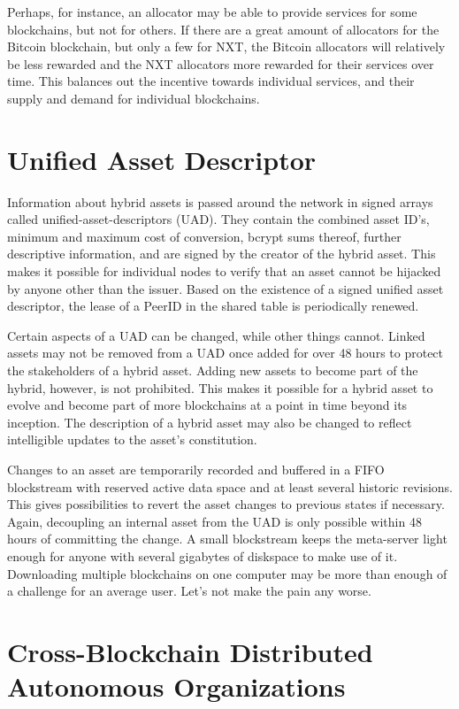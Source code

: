 \documentclass[11pt, a4paper]{article}
\begin{document}
Perhaps, for instance, an allocator may be able to provide services for some blockchains, but not for others. If there are a great amount of allocators for the Bitcoin blockchain, but only a few for NXT, the Bitcoin allocators will relatively be less rewarded and the NXT allocators more rewarded for their services over time. This balances out the incentive towards individual services, and their supply and demand for individual blockchains.


\section{Unified Asset Descriptor}

Information about hybrid assets is passed around the network in signed arrays called unified-asset-descriptors (UAD). They contain the combined asset ID's, minimum and maximum cost of conversion, bcrypt sums thereof, further descriptive information, and are signed by the creator of the hybrid asset. This makes it possible for individual nodes to verify that an asset cannot be hijacked by anyone other than the issuer. Based on the existence of a signed unified asset descriptor, the lease of a PeerID in the shared table is periodically renewed.

Certain aspects of a UAD can be changed, while other things cannot. Linked assets may not be removed from a UAD once added for over 48 hours to protect the stakeholders of a hybrid asset. Adding new assets to become part of the hybrid, however, is not prohibited. This makes it possible for a hybrid asset to evolve and become part of more blockchains at a point in time beyond its inception. The description of a hybrid asset may also be changed to reflect intelligible updates to the asset's constitution.

Changes to an asset are temporarily recorded and buffered in a FIFO blockstream with reserved active data space and at least several historic revisions. This gives possibilities to revert the asset changes to previous states if necessary. Again, decoupling an internal asset from the UAD is only possible within 48 hours of committing the change. A small blockstream keeps the meta-server light enough for anyone with several gigabytes of diskspace to make use of it. Downloading multiple blockchains on one computer may be more than enough of a challenge for an average user. Let's not make the pain any worse.


\section{Cross-Blockchain Distributed Autonomous Organizations}
\end{document}
